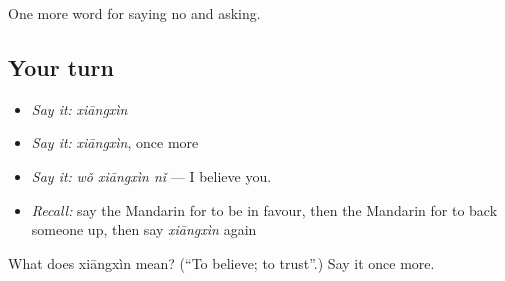 \begin{grammarlens}[title={What you've built}]
One more word for saying no and asking.
\end{grammarlens}

\subsection*{Your turn}
\begin{itemize}
\raggedright
  \item \emph{Say it:} \emph{xiāngxìn}
  \item \emph{Say it:} \emph{xiāngxìn}, once more
  \item \emph{Say it:} \emph{wǒ xiāngxìn nǐ} — I believe you.
  \item \emph{Recall:} say the Mandarin for to be in favour, then the Mandarin for to back someone up, then say \emph{xiāngxìn} again
\end{itemize}

\begin{tcolorbox}[breakable,colback=teal!4,colframe=teal!35!black,title={Before you move on}]
What does xiāngxìn mean? (\textquotedblleft{}To believe; to trust\textquotedblright{}.) Say it once more.
\end{tcolorbox}
